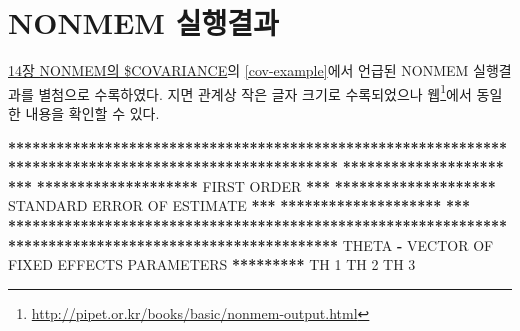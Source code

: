 \documentclass[
  11pt,
  krantz2, a4paper, twoside]{krantz}
\newenvironment{Shaded}{\begin{snugshade}}{\end{snugshade}}
\newcommand{\DecValTok}[1]{\textcolor[rgb]{0.00,0.00,0.81}{#1}}
\newcommand{\ErrorTok}[1]{\textcolor[rgb]{0.64,0.00,0.00}{\textbf{#1}}}
\newcommand{\NormalTok}[1]{#1}
\newcommand{\OperatorTok}[1]{\textcolor[rgb]{0.81,0.36,0.00}{\textbf{#1}}}
\newcommand{\StringTok}[1]{\textcolor[rgb]{0.31,0.60,0.02}{#1}}
\theoremstyle{definition}
\theoremstyle{definition}
\theoremstyle{definition}
\theoremstyle{remark}
\begin{document}
\hypertarget{nonmem-output}{%
\chapter{NONMEM 실행결과}\label{nonmem-output}}

\protect\hyperlink{cov}{14장 NONMEM의 \$COVARIANCE}의 \ref{cov-example}에서 언급된 NONMEM 실행결과를 별첨으로 수록하였다. 지면 관계상 작은 글자 크기로 수록되었으나 웹\footnote{\url{http://pipet.or.kr/books/basic/nonmem-output.html}}에서 동일한 내용을 확인할 수 있다.

\tiny

\begin{Shaded}
\begin{Highlighting}[]
\OperatorTok{**}\ErrorTok{*****************************************************************************************************}
\ErrorTok{********************}\StringTok{                                                                                }\ErrorTok{***}
\ErrorTok{********************}\StringTok{                                   }\NormalTok{FIRST ORDER                                  }\OperatorTok{**}\ErrorTok{*}
\ErrorTok{********************}\StringTok{                            }\NormalTok{STANDARD ERROR OF ESTIMATE                          }\OperatorTok{**}\ErrorTok{*}
\ErrorTok{********************}\StringTok{                                                                                }\ErrorTok{***}
\ErrorTok{*******************************************************************************************************}
\StringTok{                                                                                                       }
\StringTok{                                                                                                       }
\StringTok{                                                                                                       }
\NormalTok{THETA }\OperatorTok{{-}}\StringTok{ }\NormalTok{VECTOR OF FIXED EFFECTS PARAMETERS   }\OperatorTok{**}\ErrorTok{*******}\StringTok{                                                 }
\StringTok{                                                                                                       }
\StringTok{                                                                                                       }
\StringTok{        }\NormalTok{TH }\DecValTok{1}\NormalTok{      TH }\DecValTok{2}\NormalTok{      TH }\DecValTok{3}                                                                       
                                                                                                       

\end{Highlighting}
\end{Shaded}
\end{document}
